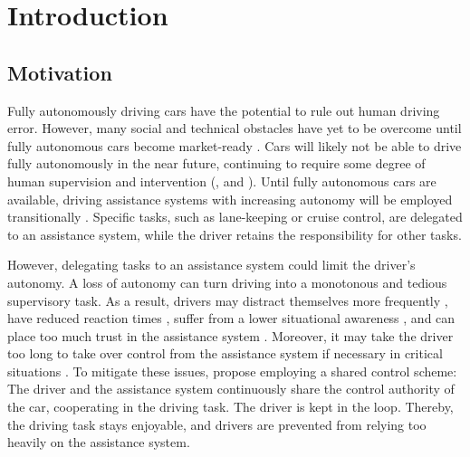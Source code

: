 \chapter{Introduction}
\label{sec:intro}

\section{Motivation}

Fully autonomously driving cars have the potential to rule out human driving error. However, many social and technical obstacles have yet to be overcome until fully autonomous cars become market-ready \parencite{autonomous_driving_book}. Cars will likely not be able to drive fully autonomously in the near future, continuing to require some degree of human supervision and intervention (\cite{human-needed}, and \cite{human-needed-2}). Until fully autonomous cars are available, driving assistance systems with increasing autonomy will be employed transitionally \parencite{autonomy-future}. Specific tasks, such as lane-keeping or cruise control, are delegated to an assistance system, while the driver retains the responsibility for other tasks.


However, delegating tasks to an assistance system could limit the driver's autonomy. A loss of autonomy can turn driving into a monotonous and tedious supervisory task. As a result, drivers may distract themselves more frequently \parencite{driver-distraction}, have reduced reaction times \parencite{reaction-time}, suffer from a lower situational awareness \parencite{situational-awareness}, and can place too much trust in the assistance system \parencite{over-trust}. Moreover, it may take the driver too long to take over control from the assistance system if necessary in critical situations \parencite{takeover-time}. To mitigate these issues, \cite{shared-control-haptics} propose employing a shared control scheme: The driver and the assistance system continuously share the control authority of the car, cooperating in the driving task. The driver is kept in the loop. Thereby, the driving task stays enjoyable, and drivers are prevented from relying too heavily on the assistance system.

